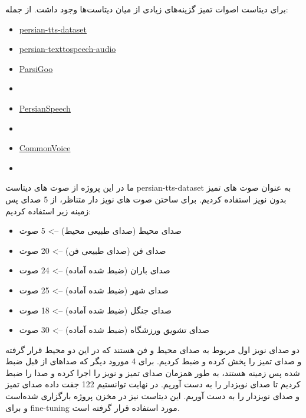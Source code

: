 \documentclass[fleqn]{report}
\begin{document}
برای دیتاست اصوات تمیز گزینه‌های زیادی از میان دیتاست‌ها وجود داشت. از جمله:

\begin{itemize}
    \item \href{https://www.kaggle.com/datasets/magnoliasis/persian-tts-dataset}{persian-tts-dataset}
    \item \href{https://www.kaggle.com/datasets/moradi/persian-texttospeech-audio}{persian-texttospeech-audio}
    \item \href{https://huggingface.co/datasets/Kamtera/ParsiGoo}{ParsiGoo}
    \item \href{https://fa.persianspeechcorpus.com/}{}
    \item \href{https://github.com/persiandataset/PersianSpeech}{PersianSpeech}
    \item \href{https://www.kaggle.com/datasets/amirpourmand/automatic-speech-recognition-farsi-youtube}{}
    \item \href{https://commonvoice.mozilla.org/en/datasets}{CommonVoice}
    \item \href{https://github.com/shenasa-ai/speech2text}{}
\end{itemize}

ما در این پروژه از صوت های دیتاست persian-tts-dataset به عنوان صوت های تمیز بدون نویز استفاده کردیم. برای ساختن صوت های نویز دار متناظر، از 5 صدای پس زمینه زیر استفاده کردیم:
\begin{itemize}
    \item صدای محیط (صدای طبیعی محیط) --> 5 صوت
    \item صدای فن (صدای طبیعی فن) --> 20 صوت
    \item صدای باران (ضبط شده آماده) --> 24 صوت
    \item صدای شهر (ضبط شده آماده) --> 25 صوت
    \item صدای جنگل (ضبط شده آماده) --> 18 صوت
    \item صدای تشویق ورزشگاه (ضبط شده آماده) --> 30 صوت
\end{itemize}

دو صدای نویز اول مربوط به صدای محیط و فن هستند که در این دو محیط قرار گرفته و صدای تمیز را پخش کرده و ضبط کردیم. برای 4 مورود دیگر که صداهای از قبل ضبط شده پس زمینه هستند، به طور همزمان صدای تمیز و نویز را اجرا کرده و صدا را ضبط کردیم تا صدای نویزدار را به دست آوریم. در نهایت توانستیم 122 جفت داده صدای تمیز و صدای نویزدار را به دست آوریم.
این دیتاست نیز در مخزن پروژه بارگزاری شده‌است و برای fine-tuning مورد استفاده قرار گرفته است.
\end{document}
